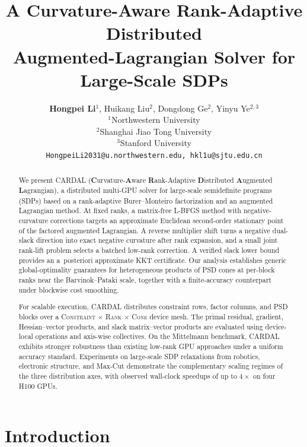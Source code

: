 \documentclass[11pt]{article}
\title{A Curvature-Aware Rank-Adaptive Distributed\\
Augmented-Lagrangian Solver for Large-Scale SDPs}
\author{%
  \textbf{Hongpei Li$^{1}$}, Huikang Liu$^2$, Dongdong Ge$^2$, Yinyu Ye$^{2,3}$\\
  $^1$Northwestern University \\ 
  $^2$Shanghai Jiao Tong University \\ 
  $^3$Stanford University \\
  \texttt{HongpeiLi2031@u.northwestern.edu, hkl1u@sjtu.edu.cn}
}
\date{}
\theoremstyle{definition}
\theoremstyle{remark}
\newcommand{\name}{\textsc{CARDAL}\xspace}
\newcommand{\nameexpand}{\textbf{C}urvature-\textbf{A}ware \textbf{R}ank-Adaptive
  \textbf{D}istributed \textbf{A}ugmented \textbf{L}agrangian}
\begin{document}
\maketitle

\begin{abstract}
We present \name{} (\nameexpand), a distributed multi-GPU solver for
large-scale semidefinite programs (SDPs) based on a rank-adaptive
Burer--Monteiro factorization and an augmented Lagrangian method.  At fixed
ranks, a matrix-free L-BFGS method with negative-curvature corrections targets
an approximate Euclidean second-order stationary point of the factored
augmented Lagrangian.  A reverse multiplier shift turns a negative dual-slack
direction into exact negative curvature after rank expansion, and a small
joint rank-lift problem selects a batched low-rank correction.  A verified
slack lower bound provides an \mbox{a posteriori} approximate KKT certificate.  Our
analysis establishes generic global-optimality guarantees for heterogeneous
products of PSD cones at per-block ranks near the Barvinok--Pataki scale,
together with a finite-accuracy counterpart under blockwise cost smoothing.

For scalable execution, \name{} distributes constraint rows, factor columns,
and PSD blocks over a
\textsc{Constraint} $\times$ \textsc{Rank} $\times$ \textsc{Cone} device mesh.
The primal residual, gradient, Hessian--vector products, and slack
matrix--vector products are evaluated using device-local operations and
axis-wise collectives.  On the Mittelmann benchmark, \name{} exhibits stronger
robustness than existing low-rank GPU approaches under a uniform accuracy
standard.  Experiments on large-scale SDP relaxations from robotics,
electronic structure, and Max-Cut demonstrate the complementary scaling
regimes of the three distribution axes, with observed wall-clock speedups of
up to $4\times$ on four H100 GPUs.

\end{abstract}

%
\section{Introduction}
\label{sec:introduction}
\end{document}
